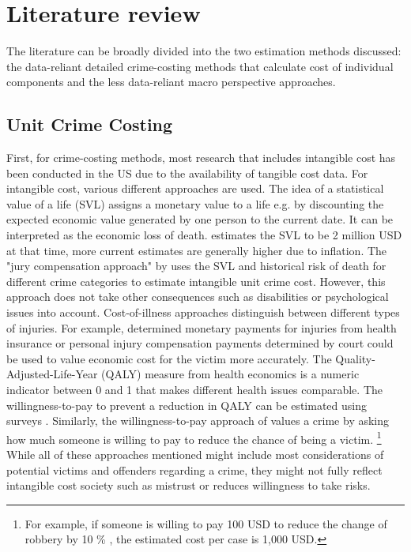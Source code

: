 \documentclass[a4paper,12pt]{article}
\begin{document}
\section{Literature review}
\label{Literature Review}
The literature can be broadly divided into the two estimation methods discussed: the data-reliant detailed crime-costing methods that calculate cost of individual components and the less data-reliant macro perspective approaches. 


\subsection{Unit Crime Costing}
First, for crime-costing methods, most research that includes intangible cost has been conducted in the US due to the availability of tangible cost data. 
For intangible cost, various different approaches are used. 
The idea of a statistical value of a life (SVL) assigns a monetary value to a life e.g. by discounting the expected economic value generated by one person to the current date. It can be interpreted as the economic loss of death. \cite{viscusi} estimates the SVL to be 2 million USD at that time, more current estimates are generally higher due to inflation.
The "jury compensation approach" by \citep{cohen1988} uses the SVL and historical risk of death for different crime categories to estimate intangible unit crime cost. However, this approach does not take other consequences such as disabilities or psychological issues into account.
Cost-of-illness approaches distinguish between different types of injuries. For example, determined monetary payments for injuries from health insurance or personal injury compensation payments determined by court could be used to value economic cost for the victim more accurately. 
The Quality-Adjusted-Life-Year (QALY) measure from health economics is a numeric indicator between 0 and 1 that makes different health issues comparable. The willingness-to-pay to prevent a reduction in QALY can be estimated using surveys \citep{entorf}.
Similarly, the willingness-to-pay approach of \citep{cohen2004} values a crime by asking how much someone is willing to pay to reduce the chance of being a victim. \footnote{For example, if someone is willing to pay 100 USD to reduce the change of robbery by 10 \% , the estimated cost per case is 1,000 USD.} 
While all of these approaches mentioned might include most considerations of potential victims and offenders regarding a crime, they might not fully reflect intangible cost society such as mistrust or reduces willingness to take risks.
\end{document}
